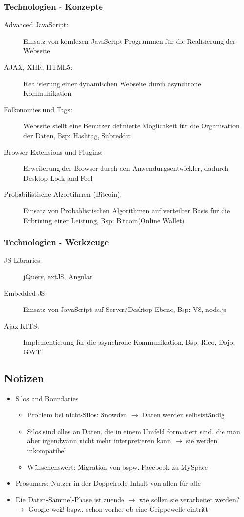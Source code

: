 \documentclass{article} %
\begin{document}
	\subsubsection{Technologien - Konzepte}
	\begin{description}
		\item[Advanced JavaScript:] Einsatz von komlexen JavaScript Programmen für die Realisierung der Webseite
		\item[AJAX, XHR, HTML5:]  Realisierung einer dynamischen Webseite durch asynchrone Kommunikation
		\item[Folkonomies und Tags:] Webseite stellt eine Benutzer definierte Möglichkeit für die Organisation der Daten, Bsp: Hashtag, Subreddit
		\item[Browser Extensions und Plugins:] Erweiterung der Browser durch den Anwendungsentwickler, dadurch Desktop Look-and-Feel
		\item[Probabilistische Algortihmen (Bitcoin):] Einsatz von Probablistischen Algorithmen auf verteilter Basis für die Erbrining einer Leistung, Bsp: Bitcoin(Online Wallet)
	\end{description}	
	\subsubsection{Technologien - Werkzeuge}
	\begin{description}
		\item[JS Libraries:] jQuery, extJS, Angular
		\item[Embedded JS:] Einsatz von JavaScript auf Server/Desktop Ebene, Bsp: V8, node.js
		\item[Ajax KITS:] Implementierung für die asynchrone Kommunikation, Bsp: Rico, Dojo, GWT
	\end{description}
	\subsection{Notizen}
		\begin{itemize}
			\item Silos and Boundaries
				\begin{itemize}
					\item Problem bei nicht-Silos: Snowden $\rightarrow$ Daten werden selbstständig
					\item Silos sind alles an Daten, die in einem Umfeld formatiert sind, die man aber irgendwann nicht mehr interpretieren kann $\rightarrow$ sie werden inkompatibel
					\item Wünschenswert: Migration von bspw. Facebook zu MySpace
				\end{itemize}
				\item Prosumers: Nutzer in der Doppelrolle \glqq Inhalt von allen für alle\grqq
				\item Die Daten-Sammel-Phase ist zuende $\rightarrow$ wie sollen sie verarbeitet werden? $\rightarrow$ Google weiß bspw. schon vorher ob eine Grippewelle eintritt
		\end{itemize}
		
\end{document}
